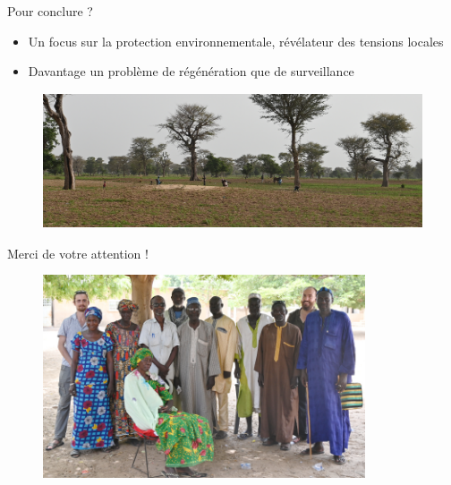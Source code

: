 \documentclass[aspectratio=169]{beamer}
\begin{document}
\begin{frame}{Pour conclure ? }
    \begin{itemize}
        \item Un focus sur la protection environnementale, révélateur des tensions locales
        \item Davantage un problème de régénération que de surveillance
    \end{itemize}
    \begin{figure}
        \centering
        \includegraphics[height = 4cm]{img/end.JPG}
    \end{figure}
\end{frame}

\begin{frame}{Merci de votre attention !}
    \begin{figure}
        \centering
        \includegraphics[height = 6cm]{img/photo_groupe.JPG}
    \end{figure}
\end{frame}
\end{document}
